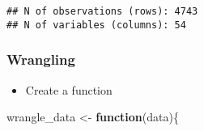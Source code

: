 \documentclass[
]{book}
\newenvironment{Shaded}{\begin{snugshade}}{\end{snugshade}}
\newcommand{\ControlFlowTok}[1]{\textcolor[rgb]{0.13,0.29,0.53}{\textbf{#1}}}
\newcommand{\NormalTok}[1]{#1}
\newcommand{\StringTok}[1]{\textcolor[rgb]{0.31,0.60,0.02}{#1}}
\providecommand{\tightlist}{%
  \setlength{\itemsep}{0pt}\setlength{\parskip}{0pt}}
\begin{document}
\begin{verbatim}
## N of observations (rows): 4743
## N of variables (columns): 54
\end{verbatim}

\hypertarget{wrangling-1}{%
\subsubsection{Wrangling}\label{wrangling-1}}

\begin{itemize}
\tightlist
\item
  Create a function
\end{itemize}

\begin{Shaded}
\begin{Highlighting}[]
\NormalTok{wrangle\_data \textless{}{-}}\StringTok{ }\ControlFlowTok{function}\NormalTok{(data)\{}


\end{Highlighting}
\end{Shaded}
\end{document}

